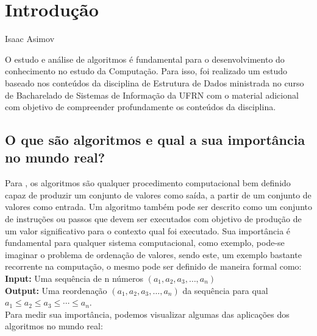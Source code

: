 
\chapter{Introdução}
\label{cap:1:intro}

{Isaac Asimov}

O estudo e análise de algoritmos é fundamental para o desenvolvimento do conhecimento
no estudo da Computação. Para isso, foi realizado um estudo baseado nos conteúdos
da disciplina de Estrutura de Dados ministrada no curso de Bacharelado de Sistemas
de Informação da UFRN com o material adicional \cite{cormen2022algorithms} com objetivo de
compreender profundamente os conteúdos da disciplina.

\section{O que são algoritmos e qual a sua importância no mundo real?}

Para \cite{cormen2022algorithms}, os algoritmos são qualquer procedimento computacional bem
definido capaz de produzir um conjunto de valores como saída, a partir de um conjunto de valores
como entrada. Um algoritmo também pode ser descrito como um conjunto de instruções ou passos que
devem ser executados com objetivo de produção de um valor significativo para o contexto qual foi
executado. Sua importância é fundamental para qualquer sistema computacional, como exemplo, pode-se
imaginar o problema de ordenação de valores, sendo este, um exemplo bastante recorrente na computação,
o mesmo pode ser definido de maneira formal como: \\

\textbf{Input: } Uma sequência de n números $(a_1, a_2, a_3,\ldots, a_n)$ \\

\textbf{Output: } Uma reordenação $(a_1, a_2, a_3,\ldots, a_n)$ da sequência para qual \\
$a_1 \leq a_2 \leq a_3 \leq \cdots \leq a_n$. \\

Para medir sua importância, podemos visualizar algumas das aplicações dos algoritmos no mundo
real:

